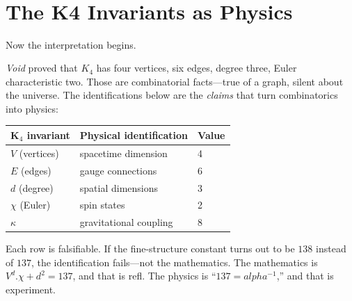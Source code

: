\documentclass[11pt,a4paper]{book}
\def\alpha{alpha}%
\def\cdot{.}%
\def\texttt#1{#1}%
\def\texorpdfstring#1#2{#2}%
\begin{document}
\begin{code}
\AgdaSymbol{(}\AgdaSpace{}%
\AgdaSpace{}%
\AgdaSymbol{)}\<%
\\
%
\\[\AgdaEmptyExtraSkip]%
\>[0]\<%
\\
\>[0]\AgdaSpace{}%
\AgdaSymbol{:}\AgdaSpace{}%
\AgdaSpace{}%
\AgdaSpace{}%
\<%
\\
\>[0]\AgdaSpace{}%
\AgdaSpace{}%
\AgdaSymbol{=}\AgdaSpace{}%
\AgdaSpace{}%
\AgdaSpace{}%
\<%
\end{code}

\section{The K\texorpdfstring{$_4$}{4} Invariants as Physics}

Now the interpretation begins.

\textit{Void} proved that $K_4$ has four vertices, six edges, degree three, Euler characteristic two. Those are combinatorial facts---true of a graph, silent about the universe. The identifications below are the \emph{claims} that turn combinatorics into physics:

\begin{center}
\begin{tabular}{lll}
\toprule
\textbf{K$_4$ invariant} & \textbf{Physical identification} & \textbf{Value} \\
\midrule
$V$ (vertices) & spacetime dimension & 4 \\
$E$ (edges)    & gauge connections   & 6 \\
$d$ (degree)   & spatial dimensions  & 3 \\
$\chi$ (Euler) & spin states         & 2 \\
$\kappa$       & gravitational coupling & 8 \\
\bottomrule
\end{tabular}
\end{center}

Each row is falsifiable. If the fine-structure constant turns out to be $138$ instead of $137$, the identification fails---not the mathematics. The mathematics is $V^d \cdot \chi + d^2 = 137$, and that is \texttt{refl}. The physics is ``$137 = \alpha^{-1}$,'' and that is experiment.
\end{document}
